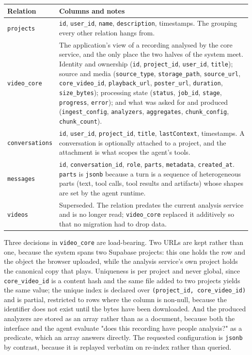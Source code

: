 \begin{table}[htbp]
\centering
\small
\begin{tabularx}{\textwidth}{@{}L{2.6cm}X@{}}
\toprule
\textbf{Relation} & \textbf{Columns and notes} \\
\midrule
\texttt{projects} & \texttt{id}, \texttt{user\_id}, \texttt{name}, \texttt{description},
timestamps. The grouping every other relation hangs from. \\
\texttt{video\_core} & The application's view of a recording analysed by the core
service, and the only place the two halves of the system meet. Identity and ownership
(\texttt{id}, \texttt{project\_id}, \texttt{user\_id}, \texttt{title}); source and media
(\texttt{source\_type}, \texttt{storage\_path}, \texttt{source\_url},
\texttt{core\_video\_id}, \texttt{playback\_url}, \texttt{poster\_url},
\texttt{duration}, \texttt{size\_bytes}); processing state (\texttt{status},
\texttt{job\_id}, \texttt{stage}, \texttt{progress}, \texttt{error}); and what was asked
for and produced (\texttt{ingest\_config}, \texttt{analyzers}, \texttt{aggregates},
\texttt{chunk\_config}, \texttt{chunk\_count}). \\
\texttt{conversations} & \texttt{id}, \texttt{user\_id}, \texttt{project\_id},
\texttt{title}, \texttt{lastContext}, timestamps. A conversation is optionally attached
to a project, and the attachment is what scopes the agent's tools. \\
\texttt{messages} & \texttt{id}, \texttt{conversation\_id}, \texttt{role},
\texttt{parts}, \texttt{metadata}, \texttt{created\_at}. \texttt{parts} is \texttt{jsonb}
because a turn is a sequence of heterogeneous parts (text, tool calls, tool results and
artifacts) whose shapes are set by the agent runtime. \\
\texttt{videos} & Superseded. The relation predates the current analysis service and is
no longer read; \texttt{video\_core} replaced it additively so that no migration had to
drop data. \\
\bottomrule
\end{tabularx}
\end{table}

Three decisions in \texttt{video\_core} are load-bearing. Two URLs are kept rather than
one, because the system spans two Supabase projects: this one holds the row and the
object the browser uploaded, while the analysis service's own project holds the canonical
copy that plays. Uniqueness is per project and never global, since
\texttt{core\_video\_id} is a content hash and the same file added to two projects yields
the same value; the unique index is declared over \texttt{(project\_id,
core\_video\_id)} and is partial, restricted to rows where the column is non-null,
because the identifier does not exist until the bytes have been downloaded. And the
produced analyzers are stored as an array rather than as a document, because both the
interface and the agent evaluate "does this recording have people analysis?" as a
predicate, which an array answers directly. The requested configuration is \texttt{jsonb}
by contrast, because it is replayed verbatim on re-index rather than queried.

